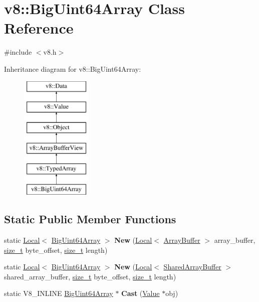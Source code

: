 \hypertarget{classv8_1_1BigUint64Array}{}\section{v8\+:\+:Big\+Uint64\+Array Class Reference}
\label{classv8_1_1BigUint64Array}


{\ttfamily \#include $<$v8.\+h$>$}

Inheritance diagram for v8\+:\+:Big\+Uint64\+Array\+:\begin{figure}[H]
\begin{center}
\leavevmode
\includegraphics[height=6.000000cm]{classv8_1_1BigUint64Array}
\end{center}
\end{figure}
\subsection*{Static Public Member Functions}
\begin{DoxyCompactItemize}
\item 
\mbox{\label{classv8_1_1BigUint64Array_a49486b6c122a92ff805500c7e3d804a2}} 
static \mbox{\hyperlink{classv8_1_1Local}{Local}}$<$ \mbox{\hyperlink{classv8_1_1BigUint64Array}{Big\+Uint64\+Array}} $>$ {\bfseries New} (\mbox{\hyperlink{classv8_1_1Local}{Local}}$<$ \mbox{\hyperlink{classv8_1_1ArrayBuffer}{Array\+Buffer}} $>$ array\+\_\+buffer, \mbox{\hyperlink{classsize__t}{size\+\_\+t}} byte\+\_\+offset, \mbox{\hyperlink{classsize__t}{size\+\_\+t}} length)
\item 
\mbox{\label{classv8_1_1BigUint64Array_af190afc53bd5e33ea828e288850a82b3}} 
static \mbox{\hyperlink{classv8_1_1Local}{Local}}$<$ \mbox{\hyperlink{classv8_1_1BigUint64Array}{Big\+Uint64\+Array}} $>$ {\bfseries New} (\mbox{\hyperlink{classv8_1_1Local}{Local}}$<$ \mbox{\hyperlink{classv8_1_1SharedArrayBuffer}{Shared\+Array\+Buffer}} $>$ shared\+\_\+array\+\_\+buffer, \mbox{\hyperlink{classsize__t}{size\+\_\+t}} byte\+\_\+offset, \mbox{\hyperlink{classsize__t}{size\+\_\+t}} length)
\item 
\mbox{\label{classv8_1_1BigUint64Array_abc27fcbc1198e9476b55a94165cea891}} 
static V8\+\_\+\+I\+N\+L\+I\+NE \mbox{\hyperlink{classv8_1_1BigUint64Array}{Big\+Uint64\+Array}} $\ast$ {\bfseries Cast} (\mbox{\hyperlink{classv8_1_1Value}{Value}} $\ast$obj)
\end{DoxyCompactItemize}
